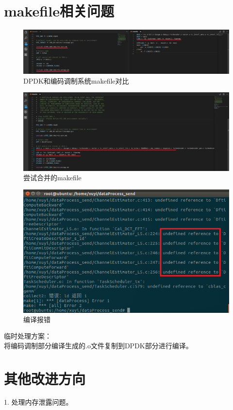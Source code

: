 \documentclass{article}
\begin{document}
\section{makefile相关问题}
\begin{figure}[H]
	\centering
	\includegraphics[width = \textwidth]{makefile_compare.png}
	\caption{DPDK和编码调制系统makefile对比}
\end{figure}
\begin{figure}[H]
	\centering
	\includegraphics[width = \textwidth]{makefile_try.png}
	\caption{尝试合并的makefile}
\end{figure}
\begin{figure}[H]
	\centering
	\includegraphics[width = .8\textwidth]{fault_makefile.png}
	\caption{编译报错}
\end{figure}

临时处理方案：\\
将编码调制部分编译生成的.o文件复制到DPDK部分进行编译。

\section{其他改进方向}
1. 处理内存泄露问题。\\
\end{document}
